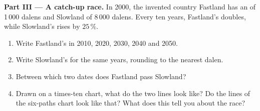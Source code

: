 \begin{problem}
\medskip
\noindent\textbf{Part III --- A catch-up race.} In 2000, the invented country
Fastland has an  of 1\,000 dalens and Slowland of
8\,000 dalens. Every ten years, Fastland's  doubles, while
Slowland's rises by $25\,\%$.
\begin{enumerate}[resume]
  \item Write Fastland's  in 2010, 2020, 2030, 2040 and 2050.
  \item Write Slowland's for the same years, rounding to the nearest dalen.
  \item Between which two dates does Fastland pass Slowland?
  \item Drawn on a times-ten chart, what do the two lines look like? Do the
        lines of the six-paths chart look like that? What does this tell you
        about the race?
\end{enumerate}
\end{problem}
